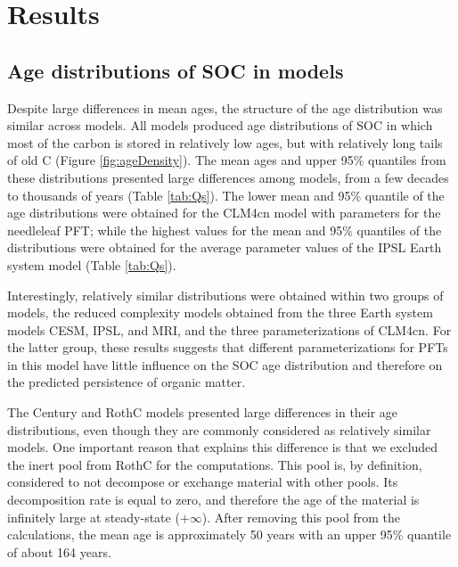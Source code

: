 \documentclass[draft,linenumbers]{agujournal}
\begin{document}

\section{Results}
\subsection{Age distributions of SOC in models}
Despite large differences in mean ages, the structure of the age distribution was similar across models. All models produced age distributions of SOC in which most of the carbon is stored in relatively low ages, but with relatively long tails of old C (Figure \ref{fig:ageDensity}). The mean ages and upper 95\% quantiles from these distributions presented large differences among models, from a few decades to thousands of years (Table \ref{tab:Qs}). The lower mean and 95\% quantile of the age distributions were obtained for the CLM4cn model with parameters for the needleleaf PFT; while the highest values for the mean and 95\% quantiles of the distributions were obtained for the average parameter values of the IPSL Earth system model (Table \ref{tab:Qs}).

Interestingly, relatively similar distributions were obtained within two groups of models, the reduced complexity models obtained from the three Earth system models CESM, IPSL, and MRI, and the three parameterizations of CLM4cn. For the latter group, these results suggests that different parameterizations for PFTs in this model have little influence on the SOC age distribution and therefore on the predicted persistence of organic matter.

The Century and RothC models presented large differences in their age distributions, even though they are commonly considered as relatively similar models. One important reason that explains this difference is that we excluded the inert pool from RothC for the computations. This pool is, by definition, considered to not decompose or exchange material with other pools. Its decomposition rate is equal to zero, and therefore the age of the material is infinitely large at steady-state ($+ \infty$). After removing this pool from the calculations, the mean age is approximately 50 years with an upper 95\% quantile of about 164 years. 
\end{document}
